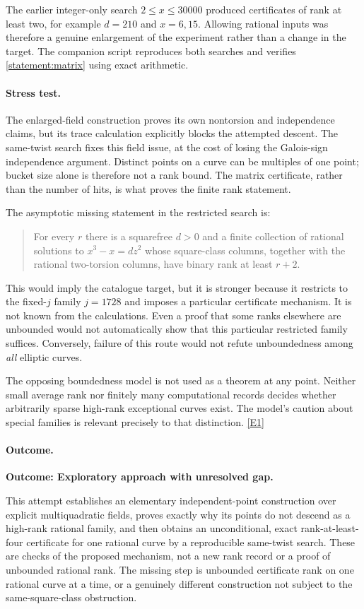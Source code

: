 \documentclass[11pt,a4paper]{article}
\newcommand{\eref}[2]{\hyperlink{extra:#1:#2}{[E#2]}}
\numberwithin{equation}{section}
\begin{document}
The earlier integer-only search $2\leq x\leq30000$ produced certificates of
rank at least two, for example $d=210$ and $x=6,15$. Allowing rational inputs
was therefore a genuine enlargement of the experiment rather than a change
in the target. The companion script reproduces both searches and verifies
\eqref{statement:matrix} using exact arithmetic.

\paragraph{Stress test.}
The enlarged-field construction proves its own nontorsion and independence
claims, but its trace calculation explicitly blocks the attempted descent.
The same-twist search fixes this field issue, at the cost of losing the
Galois-sign independence argument. Distinct points on a curve can be
multiples of one point; bucket size alone is therefore not a rank bound.
The matrix certificate, rather than the number of hits, is what proves the
finite rank statement.

The asymptotic missing statement in the restricted search is:
\begin{quote}
For every $r$ there is a squarefree $d>0$ and a finite collection of rational
solutions to $x^3-x=dz^2$ whose square-class columns, together with the
rational two-torsion columns, have binary rank at least $r+2$.
\end{quote}
This would imply the catalogue target, but it is stronger because it restricts
to the fixed-$j$ family $j=1728$ and imposes a particular certificate mechanism.
It is not known from the calculations. Even a proof that some ranks elsewhere
are unbounded would not automatically show that this particular restricted
family suffices. Conversely, failure of this route would not refute
unboundedness among \emph{all} elliptic curves.

The opposing boundedness model is not used as a theorem at any point.
Neither small average rank nor finitely many computational records decides
whether arbitrarily sparse high-rank exceptional curves exist. The model's
caution about special families is relevant precisely to that distinction.
\eref{statement}{1}

\paragraph{Outcome.}
\textbf{Outcome: Exploratory approach with unresolved gap.}

This attempt establishes an elementary independent-point construction over
explicit multiquadratic fields, proves exactly why its points do not descend
as a high-rank rational family, and then obtains an unconditional, exact
rank-at-least-four certificate for one rational curve by a reproducible
same-twist search. These are checks of the proposed mechanism, not a new
rank record or a proof of unbounded rational rank. The missing step is
unbounded certificate rank on one rational curve at a time, or a genuinely
different construction not subject to the same-square-class obstruction.
\end{document}
